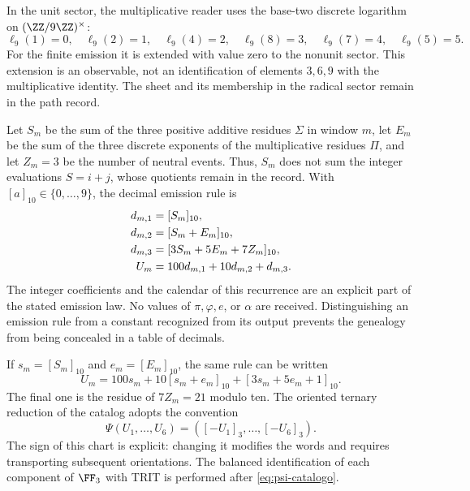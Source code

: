 In the unit sector, the multiplicative reader uses the base-two discrete logarithm on \((\ZZ/9\ZZ)^\times\):
\[
 \ell_9(1)=0,\quad\ell_9(2)=1,\quad\ell_9(4)=2,\quad
 \ell_9(8)=3,\quad\ell_9(7)=4,\quad\ell_9(5)=5.
\]
For the finite emission it is extended with value zero to the nonunit sector. This extension is an observable, not an identification of elements \(3,6,9\) with the multiplicative identity. The sheet and its membership in the radical sector remain in the path record.

Let \(S_m\) be the sum of the three positive additive residues \(\Sigma\) in window \(m\), let \(E_m\) be the sum of the three discrete exponents of the multiplicative residues \(\Pi\), and let \(Z_m=3\) be the number of neutral events. Thus, \(S_m\) does not sum the integer evaluations \(S=i+j\), whose quotients remain in the record. With \([a]_{10}\in\{0,\ldots,9\}\), the decimal emission rule is
\begin{align}
 d_{m,1}&=[S_m]_{10},\notag\\
 d_{m,2}&=[S_m+E_m]_{10},\notag\\
 d_{m,3}&=[3S_m+5E_m+7Z_m]_{10},\notag\\
 U_m&=100d_{m,1}+10d_{m,2}+d_{m,3}.
 \label{eq:emisor-seis}
\end{align}
The integer coefficients and the calendar of this recurrence are an explicit part of the stated emission law. No values of \(\pi,\varphi,e\), or \(\alpha\) are received. Distinguishing an emission rule from a constant recognized from its output prevents the genealogy from being concealed in a table of decimals.

If \(s_m=[S_m]_{10}\) and \(e_m=[E_m]_{10}\), the same rule can be written
\begin{equation}
 U_m=100s_m+10[s_m+e_m]_{10}+[3s_m+5e_m+1]_{10}.
 \label{eq:acoplamiento}
\end{equation}
The final one is the residue of \(7Z_m=21\) modulo ten. The oriented ternary reduction of the catalog adopts the convention
\begin{equation}
 \Psi(U_1,\ldots,U_6)=([-U_1]_3,\ldots,[-U_6]_3).
 \label{eq:psi-catalogo}
\end{equation}
The sign of this chart is explicit: changing it modifies the words and requires transporting subsequent orientations. The balanced identification of each component of \(\FF_3\) with TRIT is performed after \eqref{eq:psi-catalogo}.

